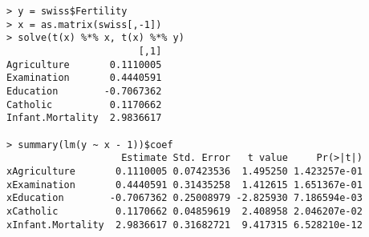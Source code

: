 \begin{verbatim}
> y = swiss$Fertility
> x = as.matrix(swiss[,-1])
> solve(t(x) %*% x, t(x) %*% y)
                       [,1]
Agriculture       0.1110005
Examination       0.4440591
Education        -0.7067362
Catholic          0.1170662
Infant.Mortality  2.9836617

> summary(lm(y ~ x - 1))$coef
                    Estimate Std. Error   t value     Pr(>|t|)
xAgriculture       0.1110005 0.07423536  1.495250 1.423257e-01
xExamination       0.4440591 0.31435258  1.412615 1.651367e-01
xEducation        -0.7067362 0.25008979 -2.825930 7.186594e-03
xCatholic          0.1170662 0.04859619  2.408958 2.046207e-02
xInfant.Mortality  2.9836617 0.31682721  9.417315 6.528210e-12
\end{verbatim}

%
